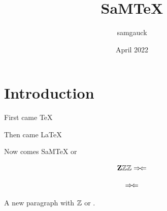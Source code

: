 \documentclass{article}
\title{SaMTeX}
\author{samgauck }
\date{April 2022}
\begin{document}
\maketitle

\section{Introduction}

First came \TeX

Then came \LaTeX{}

Now comes SaMTeX or \SaMTeX{}

$$\mathbf{Z}
\mathbb{Z}
\Z
\contradiction$$

$$\Rightarrow\mskip-\thinmuskip\Leftarrow$$

\phindent A new paragraph with $\mathbb{Z}$ or \Z.\Q\R\Z\C\N\Nplus\Fplus\Fminus
\end{document}

